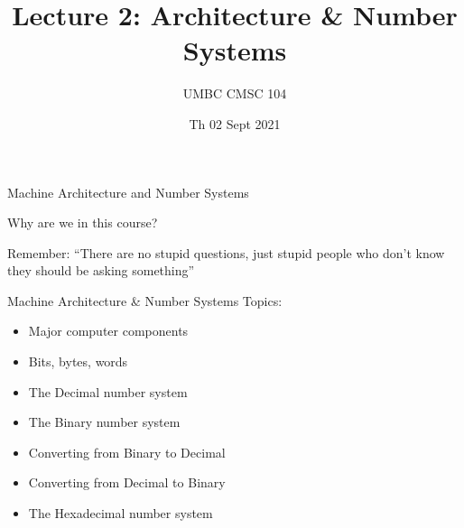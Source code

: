 \documentclass[graphics]{beamer}
\title{Lecture 2: Architecture \& Number Systems}
\author{UMBC CMSC 104}
\date{Th 02 Sept 2021}
\begin{document}
\begin{frame}{}
\centering
    Machine Architecture and Number Systems
\end{frame}

\begin{frame}{Why are we in this course?}
    
    \newline
    Remember: ``There are no stupid questions, just stupid people who don't know they should be asking something''
\end{frame}

\begin{frame}{Machine Architecture \& Number Systems}
Topics:
\begin{itemize}
    \item Major computer components
    \item Bits, bytes, words
    \item The Decimal number system
    \item The Binary number system
    \item Converting from Binary to Decimal
    \item Converting from Decimal to Binary
    \item The Hexadecimal number system
\end{itemize}
    
\end{frame}
\end{document}
